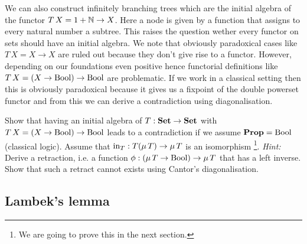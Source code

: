 We can also construct infinitely branching trees which are the initial algebra of the functor $T\,X = 1 + \mathbb{N} \to X$. Here a node is given by a function that assigns to every natural number a subtree. This raises the question wether every functor on sets should have an initial algebra. We note that obviously paradoxical cases like $T\,X = X \to X$ are ruled out because they don't give rise to a functor. However, depending on our foundations even positive hence functorial definitions like $T\,X = (X \to \mathrm{Bool}) \to \mathrm{Bool}$ are problematic. If we work in a classical setting then this is obviously paradoxical because it gives us a fixpoint of the double powerset functor and from this we can derive a contradiction using diagonalisation.
\begin{Exercise}
Show that having an initial algebra of $T : \mathbf{Set} \to \mathbf{Set}$ with $T\,X = (X \to \mathrm{Bool}) \to \mathrm{Bool}$ leads to a contradiction if we assume $\mathbf{Prop} = \mathrm{Bool}$ (classical logic). Assume that $\mathrm{in}_T : T (\mu\,T) \to \mu\,T$ is an isomorphism
\footnote{We are going to prove this in the next section.}.
\emph{Hint:} Derive a retraction, i.e. a function $\phi : (\mu\,T \to \mathrm{Bool}) \to \mu\,T$ that has a left inverse. Show that such a retract cannot exists using Cantor's diagonalisation.
\end{Exercise}

\subsection{Lambek's lemma}
\label{sec:lambeks-lemma}

